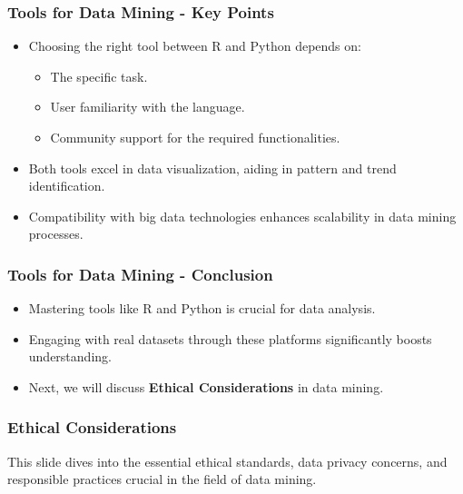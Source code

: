 \documentclass[aspectratio=169]{beamer}
\begin{document}
\begin{frame}[fragile]
    \frametitle{Tools for Data Mining - Key Points}
    \begin{itemize}
        \item Choosing the right tool between R and Python depends on:
        \begin{itemize}
            \item The specific task.
            \item User familiarity with the language.
            \item Community support for the required functionalities.
        \end{itemize}
        \item Both tools excel in data visualization, aiding in pattern and trend identification.
        \item Compatibility with big data technologies enhances scalability in data mining processes.
    \end{itemize}
\end{frame}

\begin{frame}[fragile]
    \frametitle{Tools for Data Mining - Conclusion}
    \begin{itemize}
        \item Mastering tools like R and Python is crucial for data analysis.
        \item Engaging with real datasets through these platforms significantly boosts understanding.
        \item Next, we will discuss \textbf{Ethical Considerations} in data mining.
    \end{itemize}
\end{frame}

\begin{frame}[fragile]
    \frametitle{Ethical Considerations}
    This slide dives into the essential ethical standards, data privacy concerns, and responsible practices crucial in the field of data mining.
\end{frame}
\end{document}
